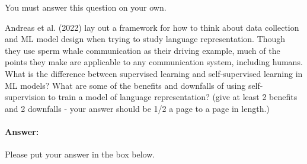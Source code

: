 \documentclass[10pt]{article}
\newenvironment{AnswerBox}{\begin{mdframed}[style=simple]}{\end{mdframed}}
\begin{document}
You must answer this question on your own.

Andreas et al. (2022) lay out a framework for how to think about data collection and ML model design when trying to study language representation. Though they use sperm whale communication as their driving example, much of the points they make are applicable to any communication system, including humans. What is the difference between supervised learning and self-supervised learning in ML models? What are some of the benefits and downfalls of using self-supervision to train a model of language representation? (give at least 2 benefits and 2 downfalls - your answer should be 1/2 a page to a page in length.)


\paragraph{Answer:} Please put your answer in the box below.

\begin{AnswerBox}%


\end{AnswerBox}%
\end{document}

